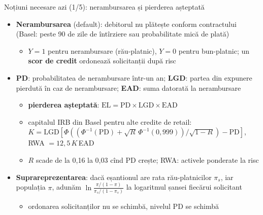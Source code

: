 \begin{frame}{Noțiuni necesare azi (1/5): nerambursarea și pierderea așteptată}
\itemsize{\footnotesize}
\begin{itemize}
    \item \textbf{Nerambursarea} (default): debitorul nu plătește conform contractului (Basel: peste 90 de zile de întîrziere sau probabilitate mică de plată) 
    \begin{itemize}
        \item $Y = 1$ pentru nerambursare (rău-platnic), $Y = 0$ pentru bun-platnic; un \textbf{scor de credit} ordonează solicitanții după risc
    \end{itemize}
    \item \textbf{PD}: probabilitatea de nerambursare într-un an; \textbf{LGD}: partea din expunere pierdută în caz de nerambursare; \textbf{EAD}: suma datorată la nerambursare
    \begin{itemize}
        \item \textbf{pierderea așteptată}: $\mathrm{EL} = \mathrm{PD} \times \mathrm{LGD} \times \mathrm{EAD}$
        \item capitalul IRB din Basel pentru alte credite de retail: $K = \mathrm{LGD}[\Phi((\Phi^{-1}(\mathrm{PD}) + \sqrt{R}\,\Phi^{-1}(0{,}999))/\sqrt{1 - R}) - \mathrm{PD}]$, RWA $= 12{,}5\,K\,$EAD
        \item $R$ scade de la 0,16 la 0,03 cînd PD crește; RWA: activele ponderate la risc
    \end{itemize}
    \item \textbf{Suprareprezentarea}: dacă eșantionul are rata rău-platnicilor $\pi_s$, iar populația $\pi$, adunăm $\ln\frac{\pi/(1 - \pi)}{\pi_s/(1 - \pi_s)}$ la logaritmul șansei fiecărui solicitant
    \begin{itemize}
        \item ordonarea solicitanților nu se schimbă, nivelul PD se schimbă
    \end{itemize}
\end{itemize}
\end{frame}

